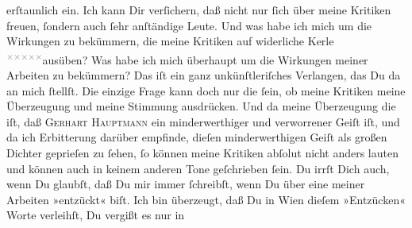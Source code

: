 \begin{ledgroupsized}[t]{13cm}
               erſtaunlich \label{K_L03091-2v}\label{K_L03091-2h} ein. Ich kann Dir verſichern, daß
                  {\pb}nicht nur \label{K_L03091-3v}\label{K_L03091-3h} ſich über meine Kritiken freuen, ſondern auch ſehr anſtändige Leute. Und was
               habe ich mich um die Wirkungen zu bekümmern, die meine Kritiken { } auf widerliche Kerle \substVorne{}\textsuperscript{\textcolor{gray}{×}\-\textcolor{gray}{×}\-\textcolor{gray}{×}\-\textcolor{gray}{×}\-\textcolor{gray}{×}}\substDazwischen{}ausüben\substHinten{}? Was habe ich mich überhaupt um die Wirkungen meiner Arbeiten zu bekümmern?
               Das iſt \strikeout{\textcolor{gray}{doch}} ein ganz unkünſtleriſches Verlangen, das Du da an mich ſtellſt. Die einzige
               Frage kann doch nur die ſein, ob meine Kritiken meine Überzeugung und meine Stimmung
               ausdrücken. Und da meine Überzeugung die iſt, daß \textsc{Gerhart Hauptmann} ein minderwerthiger {\pb}und verworrener Geiſt
               iſt, und da ich Erbitterung darüber empfinde, dieſen minderwerthigen Geiſt als großen Dichter
               geprieſen zu ſehen, ſo \strikeout{\textcolor{gray}{ſ}} können meine Kritiken abſolut nicht anders lauten und können auch in keinem
               anderen Tone geſchrieben ſein.\pend
           \pstart
           Du irrſt Dich auch, wenn Du glaubſt, daß Du mir immer ſchreibſt, wenn Du über eine
               meiner Arbeiten »entzückt« biſt. Ich bin überzeugt, daß Du in Wien dieſem »Entzücken« Worte verleihſt, Du vergißt es nur in

\end{ledgroupsized}
